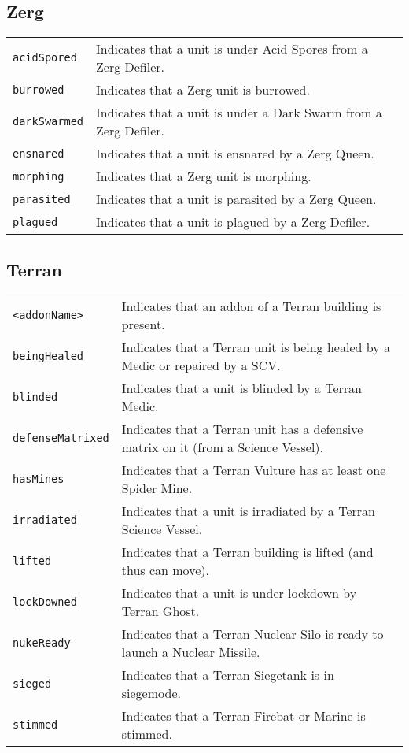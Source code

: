 \subsection{Zerg}
\begin{tabularx}{\textwidth}{lX}
 \verb|acidSpored | & Indicates that a unit is under Acid Spores from a Zerg Defiler. \\
 \verb|burrowed| & Indicates that a Zerg unit is burrowed. \\
 \verb|darkSwarmed| & Indicates that a unit is under a Dark Swarm from a Zerg Defiler. \\
 \verb|ensnared| & Indicates that a unit is ensnared by a Zerg Queen. \\
 \verb|morphing| & Indicates that a Zerg unit is morphing. \\
 \verb|parasited| & Indicates that a unit is parasited by a Zerg Queen. \\
 \verb|plagued| & Indicates that a unit is plagued by a Zerg Defiler.
\end{tabularx}

\subsection{Terran}
\begin{tabularx}{\textwidth}{lX}
 \verb|<addonName>| & Indicates that an addon of a Terran building is present. \\
 \verb|beingHealed| & Indicates that a Terran unit is being healed by a Medic or repaired by a SCV. \\
 \verb|blinded| & Indicates that a unit is blinded by a Terran Medic. \\
 \verb|defenseMatrixed| & Indicates that a Terran unit has a defensive matrix on it (from a Science Vessel).\\
 \verb|hasMines| & Indicates that a Terran Vulture has at least one Spider Mine. \\
 \verb|irradiated| & Indicates that a unit is irradiated by a Terran Science Vessel. \\
 \verb|lifted| & Indicates that a Terran building is lifted (and thus can move). \\
 \verb|lockDowned| & Indicates that a unit is under lockdown by Terran Ghost. \\
 \verb|nukeReady| & Indicates that a Terran Nuclear Silo is ready to launch a Nuclear Missile. \\
 \verb|sieged| & Indicates that a Terran Siegetank is in siegemode. \\
 \verb|stimmed| & Indicates that a Terran Firebat or Marine is stimmed.
\end{tabularx}


